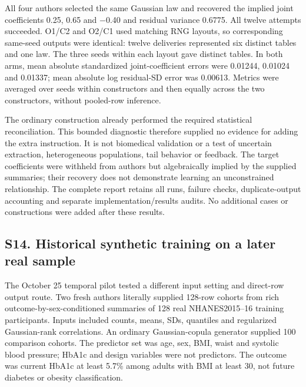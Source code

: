 \documentclass[11pt,letterpaper]{article}
\begin{document}
All four authors selected the same Gaussian law and recovered the implied joint coefficients 0.25, 0.65 and −0.40 and residual variance 0.6775. All twelve attempts succeeded. O1/\allowbreak{}C2 and O2/\allowbreak{}C1 used matching RNG layouts, so corresponding same-seed outputs were identical: twelve deliveries represented six distinct tables and one law. The three seeds within each layout gave distinct tables. In both arms, mean absolute standardized joint-coefficient errors were 0.01244, 0.01024 and 0.01337; mean absolute log residual-SD error was 0.00613. Metrics were averaged over seeds within constructors and then equally across the two constructors, without pooled-row inference.


The ordinary construction already performed the required statistical reconciliation. This bounded diagnostic therefore supplied no evidence for adding the extra instruction. It is not biomedical validation or a test of uncertain extraction, heterogeneous populations, tail behavior or feedback. The target coefficients were withheld from authors but algebraically implied by the supplied summaries; their recovery does not demonstrate learning an unconstrained relationship. The complete report retains all runs, failure checks, duplicate-output accounting and separate implementation/\allowbreak{}results audits. No additional cases or constructions were added after these results.


\subsection*{S14. Historical synthetic training on a later real sample}

The October 25 temporal pilot tested a different input setting and direct-row output route. Two fresh authors literally supplied 128-row cohorts from rich outcome-by-sex-conditioned summaries of 128 real NHANES2015–\allowbreak{}16 training participants. Inputs included counts, means, SDs, quantiles and regularized Gaussian-rank correlations. An ordinary Gaussian-copula generator supplied 100 comparison cohorts. The predictor set was age, sex, BMI, waist and systolic blood pressure; HbA1c and design variables were not predictors. The outcome was current HbA1c at least 5.7\% among adults with BMI at least 30, not future diabetes or obesity classification.
\end{document}

